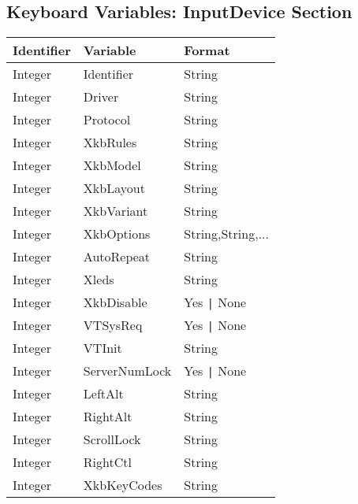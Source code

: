 \subsection{Keyboard Variables: InputDevice Section}
\begin{tabular}[h]{|p{2cm}|p{4cm}|p{7cm}|}
 \hline
 \textbf{Identifier} & \textbf{Variable}     & \textbf{Format}        \\
 \hline
 Integer & Identifier       & String                             \\
 Integer & Driver           & String                             \\
 Integer & Protocol         & String                             \\
 Integer & XkbRules         & String                             \\
 Integer & XkbModel         & String                             \\
 Integer & XkbLayout        & String                             \\
 Integer & XkbVariant       & String                             \\
 Integer & XkbOptions       & String,String,...                  \\
 Integer & AutoRepeat       & String                             \\
 Integer & Xleds            & String                             \\
 Integer & XkbDisable       & Yes \verb+|+ None                  \\
 Integer & VTSysReq         & Yes \verb+|+ None                  \\
 Integer & VTInit           & String                             \\
 Integer & ServerNumLock    & Yes \verb+|+ None                  \\
 Integer & LeftAlt          & String                             \\
 Integer & RightAlt         & String                             \\
 Integer & ScrollLock       & String                             \\
 Integer & RightCtl         & String                             \\
 Integer & XkbKeyCodes      & String                             \\
 \hline
\end{tabular}


\newpage
{}
